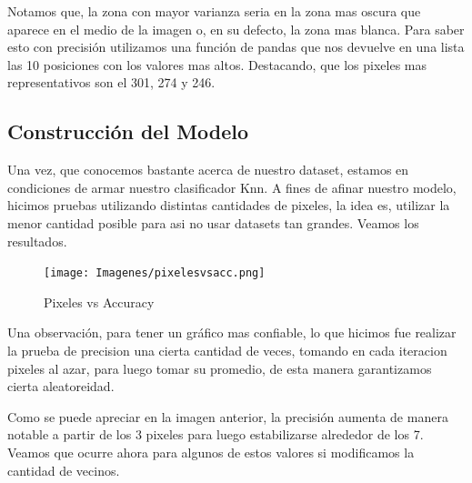 \documentclass[10pt,a4paper]{article}
\begin{document}
Notamos que, la zona con mayor varianza seria en la zona mas oscura que aparece en el medio de la imagen o, en su defecto, la zona mas blanca. Para saber esto con precisión utilizamos una función de pandas que nos devuelve en una lista las 10 posiciones con los valores mas altos. Destacando, que los pixeles
mas representativos son el 301, 274 y 246. 

\subsection{Construcción del Modelo} \vspace{0.1cm}

Una vez, que conocemos bastante acerca de nuestro dataset, estamos en condiciones de armar nuestro clasificador Knn. A fines de afinar nuestro modelo, hicimos pruebas utilizando distintas cantidades de pixeles, la idea es, utilizar la menor cantidad posible para asi no usar datasets tan grandes. Veamos los resultados.

\begin{figure}[h]
  \centering
  \texttt{[image: Imagenes/pixelesvsacc.png]}
  \caption{Pixeles vs Accuracy}
  \label{fig:Tabla 1}
\end{figure}

Una observación, para tener un gráfico mas confiable, lo que hicimos fue realizar la prueba de precision una cierta cantidad de veces, tomando en cada iteracion pixeles al azar, para luego tomar su promedio, de esta manera garantizamos cierta aleatoreidad.

\newpage

Como se puede apreciar en la imagen anterior, la precisión aumenta de manera notable a partir de los 3 pixeles para luego estabilizarse alrededor de los 7.
Veamos que ocurre ahora para algunos de estos valores si modificamos la cantidad de vecinos.
\end{document}
